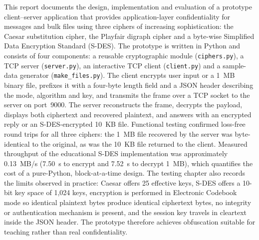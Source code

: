This report documents the design, implementation and evaluation of a prototype
client--server application that provides application-layer confidentiality for
messages and bulk files using three ciphers of increasing sophistication: the
Caesar substitution cipher, the Playfair digraph cipher and a byte-wise
Simplified Data Encryption Standard (S-DES). The prototype is written in Python
and consists of four components: a reusable cryptographic module
(\texttt{ciphers.py}), a TCP server (\texttt{server.py}), an interactive TCP
client (\texttt{client.py}) and a sample-data generator
(\texttt{make\_files.py}). The client encrypts user input or a 1~MB binary file,
prefixes it with a four-byte length field and a JSON header describing the mode,
algorithm and key, and transmits the frame over a TCP socket to the server on
port~9000. The server reconstructs the frame, decrypts the payload, displays both
ciphertext and recovered plaintext, and answers with an encrypted reply or an
S-DES-encrypted 10~KB file. Functional testing confirmed loss-free round trips
for all three ciphers: the 1~MB file recovered by the server was byte-identical
to the original, as was the 10~KB file returned to the client. Measured
throughput of the educational S-DES implementation was approximately
0.13~MB/s (7.50~s to encrypt and 7.52~s to decrypt 1~MB), which quantifies the
cost of a pure-Python, block-at-a-time design. The testing chapter also records
the limits observed in practice: Caesar offers 25 effective keys, S-DES offers a
10-bit key space of 1{,}024 keys, encryption is performed in Electronic Codebook
mode so identical plaintext bytes produce identical ciphertext bytes, no
integrity or authentication mechanism is present, and the session key travels in
cleartext inside the JSON header. The prototype therefore achieves obfuscation
suitable for teaching rather than real confidentiality.
